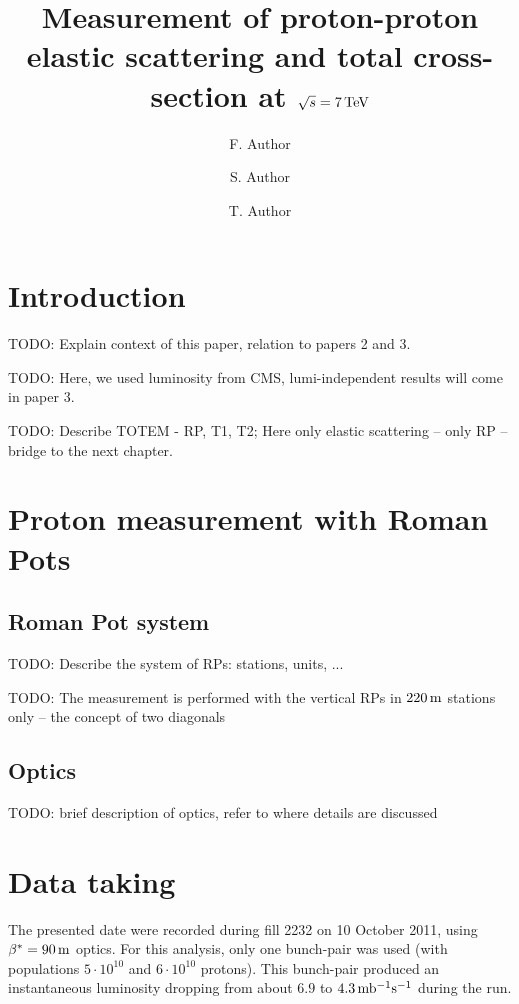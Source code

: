 \documentclass[doublecol]{../macros/epl2}
\title{Measurement of proton-proton elastic scattering and total cross-section at $\sqrt s = 7\,\rm TeV$}
\author{F. Author\inst{1,2} \and S. Author\inst{1} \and T. Author\inst{2}}
\institute{                    
  \inst{1} First Institute - Address\\
  \inst{2} Second Institute - Address
}
\def\un#1{\,{\rm #1}}
\begin{document}
\maketitle

\section{Introduction}

TODO: Explain context of this paper, relation to papers 2 and 3.

TODO: Here, we used luminosity from CMS, lumi-independent results will come in paper 3.

TODO: Describe TOTEM - RP, T1, T2; Here only elastic scattering -- only RP -- bridge to the next chapter.


\section{Proton measurement with Roman Pots}

\subsection{Roman Pot system}

TODO: Describe the system of RPs: stations, units, ...

TODO: The measurement is performed with the vertical RPs in $220\un{m}$ stations only -- the concept of two diagonals

\subsection{Optics}

TODO: brief description of optics, refer to \cite{epl96} where details are discussed


\section{Data taking}

The presented date were recorded during fill 2232 on 10 October 2011, using $\beta^* = 90\un{m}$ optics. For this analysis, only one bunch-pair was used (with populations $5\cdot10^{10}$ and $6\cdot10^{10}$ protons). This bunch-pair produced an instantaneous luminosity dropping from about $6.9$ to $4.3\un{mb^{-1} s^{-1}}$ during the run.
\end{document}
